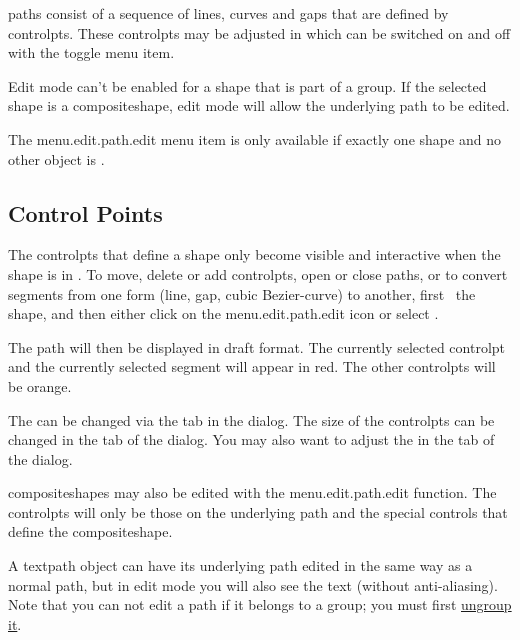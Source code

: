 \Glspl{path} consist of a sequence of lines, curves and \glspl{gap} 
that are defined by \glspl{controlpt}. These \glspl{controlpt} may be adjusted in
\emph{} which can be switched on and off
with the  toggle menu item.

\begin{information}
Edit mode can't be enabled for a \gls{shape} that is part of a \gls{group}.
If the selected shape is a \gls{compositeshape}, edit mode will allow the
underlying path to be edited.
\end{information}

The \gls{menu.edit.path.edit} menu item
is only available if exactly one \gls{shape} and no other
\gls{object} is \selected.

\subsection{Control Points}\label{sec:editcontrolpt}

The \glspl{controlpt} that define a \gls{shape} only become visible
and interactive when the shape is in \editpathmode.
To move, delete or add \glspl{controlpt}, open or close
\glspl{path}, or to convert segments from one form (line, \gls{gap}, cubic
\gls{Bezier-curve}) to another, first \select\ the \gls*{shape}, and
then either click on the \gls{menu.edit.path.edit} icon or select
.

The \gls*{path} will then be displayed in draft format.  The
currently selected \gls*{controlpt} and the currently selected
segment will appear in red. The other \glspl*{controlpt} will be
orange.

\begin{information}
The  can be changed via the 
tab in the  dialog. The size of the
\glspl{controlpt} can be changed in the  tab
of the  dialog. You may also want to adjust the
 in the  tab of the
 dialog.
\end{information}

\Glspl{compositeshape} may also be edited with 
the \gls{menu.edit.path.edit} function. The
\glspl{controlpt} will only be those on the underlying path and 
the special controls that define the \gls{compositeshape}.

A \gls{textpath} object can have its underlying path edited in the
same way as a normal \gls{path}, but in edit mode you will also see
the text (without \gls{anti-aliasing}).  Note that you can not edit
a \gls{path} if it belongs to a \gls{group}; you must first
\hyperref[sec:grouping]{ungroup it}.

